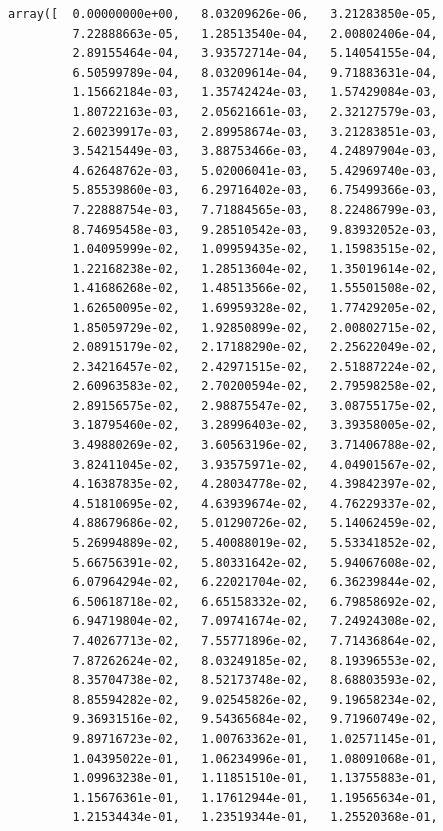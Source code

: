\documentclass[11pt]{article}
\begin{document}
\begin{verbatim}
array([  0.00000000e+00,   8.03209626e-06,   3.21283850e-05,
         7.22888663e-05,   1.28513540e-04,   2.00802406e-04,
         2.89155464e-04,   3.93572714e-04,   5.14054155e-04,
         6.50599789e-04,   8.03209614e-04,   9.71883631e-04,
         1.15662184e-03,   1.35742424e-03,   1.57429084e-03,
         1.80722163e-03,   2.05621661e-03,   2.32127579e-03,
         2.60239917e-03,   2.89958674e-03,   3.21283851e-03,
         3.54215449e-03,   3.88753466e-03,   4.24897904e-03,
         4.62648762e-03,   5.02006041e-03,   5.42969740e-03,
         5.85539860e-03,   6.29716402e-03,   6.75499366e-03,
         7.22888754e-03,   7.71884565e-03,   8.22486799e-03,
         8.74695458e-03,   9.28510542e-03,   9.83932052e-03,
         1.04095999e-02,   1.09959435e-02,   1.15983515e-02,
         1.22168238e-02,   1.28513604e-02,   1.35019614e-02,
         1.41686268e-02,   1.48513566e-02,   1.55501508e-02,
         1.62650095e-02,   1.69959328e-02,   1.77429205e-02,
         1.85059729e-02,   1.92850899e-02,   2.00802715e-02,
         2.08915179e-02,   2.17188290e-02,   2.25622049e-02,
         2.34216457e-02,   2.42971515e-02,   2.51887224e-02,
         2.60963583e-02,   2.70200594e-02,   2.79598258e-02,
         2.89156575e-02,   2.98875547e-02,   3.08755175e-02,
         3.18795460e-02,   3.28996403e-02,   3.39358005e-02,
         3.49880269e-02,   3.60563196e-02,   3.71406788e-02,
         3.82411045e-02,   3.93575971e-02,   4.04901567e-02,
         4.16387835e-02,   4.28034778e-02,   4.39842397e-02,
         4.51810695e-02,   4.63939674e-02,   4.76229337e-02,
         4.88679686e-02,   5.01290726e-02,   5.14062459e-02,
         5.26994889e-02,   5.40088019e-02,   5.53341852e-02,
         5.66756391e-02,   5.80331642e-02,   5.94067608e-02,
         6.07964294e-02,   6.22021704e-02,   6.36239844e-02,
         6.50618718e-02,   6.65158332e-02,   6.79858692e-02,
         6.94719804e-02,   7.09741674e-02,   7.24924308e-02,
         7.40267713e-02,   7.55771896e-02,   7.71436864e-02,
         7.87262624e-02,   8.03249185e-02,   8.19396553e-02,
         8.35704738e-02,   8.52173748e-02,   8.68803593e-02,
         8.85594282e-02,   9.02545826e-02,   9.19658234e-02,
         9.36931516e-02,   9.54365684e-02,   9.71960749e-02,
         9.89716723e-02,   1.00763362e-01,   1.02571145e-01,
         1.04395022e-01,   1.06234996e-01,   1.08091068e-01,
         1.09963238e-01,   1.11851510e-01,   1.13755883e-01,
         1.15676361e-01,   1.17612944e-01,   1.19565634e-01,
         1.21534434e-01,   1.23519344e-01,   1.25520368e-01,

\end{verbatim}
\end{document}
